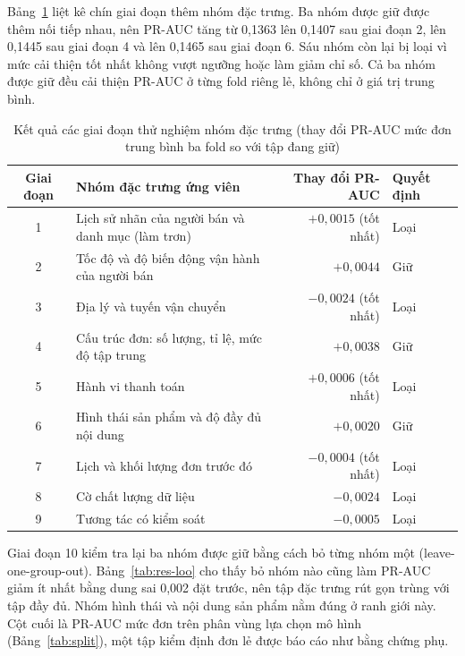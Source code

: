 \documentclass[12pt,a4paper]{report}
\begin{document}
Bảng~\ref{tab:res-phases} liệt kê chín giai đoạn thêm nhóm đặc trưng. Ba nhóm được giữ được thêm nối tiếp nhau, nên PR-AUC tăng từ 0,1363 lên 0,1407 sau giai đoạn 2, lên 0,1445 sau giai đoạn 4 và lên 0,1465 sau giai đoạn 6. Sáu nhóm còn lại bị loại vì mức cải thiện tốt nhất không vượt ngưỡng hoặc làm giảm chỉ số. Cả ba nhóm được giữ đều cải thiện PR-AUC ở từng fold riêng lẻ, không chỉ ở giá trị trung bình.

\begin{table}[htbp]\centering\small
\caption{Kết quả các giai đoạn thử nghiệm nhóm đặc trưng (thay đổi PR-AUC mức đơn trung bình ba fold so với tập đang giữ)}\label{tab:res-phases}
\begin{tabular}{clrl}
\toprule
Giai đoạn & Nhóm đặc trưng ứng viên & Thay đổi PR-AUC & Quyết định \\
\midrule
1 & Lịch sử nhãn của người bán và danh mục (làm trơn) & $+0{,}0015$ (tốt nhất) & Loại \\
2 & Tốc độ và độ biến động vận hành của người bán & $+0{,}0044$ & Giữ \\
3 & Địa lý và tuyến vận chuyển & $-0{,}0024$ (tốt nhất) & Loại \\
4 & Cấu trúc đơn: số lượng, tỉ lệ, mức độ tập trung & $+0{,}0038$ & Giữ \\
5 & Hành vi thanh toán & $+0{,}0006$ (tốt nhất) & Loại \\
6 & Hình thái sản phẩm và độ đầy đủ nội dung & $+0{,}0020$ & Giữ \\
7 & Lịch và khối lượng đơn trước đó & $-0{,}0004$ (tốt nhất) & Loại \\
8 & Cờ chất lượng dữ liệu & $-0{,}0024$ & Loại \\
9 & Tương tác có kiểm soát & $-0{,}0005$ & Loại \\
\bottomrule
\end{tabular}
\end{table}

Giai đoạn 10 kiểm tra lại ba nhóm được giữ bằng cách bỏ từng nhóm một (leave-one-group-out). Bảng~\ref{tab:res-loo} cho thấy bỏ nhóm nào cũng làm PR-AUC giảm ít nhất bằng dung sai 0,002 đặt trước, nên tập đặc trưng rút gọn trùng với tập đầy đủ. Nhóm hình thái và nội dung sản phẩm nằm đúng ở ranh giới này. Cột cuối là PR-AUC mức đơn trên phân vùng lựa chọn mô hình (Bảng~\ref{tab:split}), một tập kiểm định đơn lẻ được báo cáo như bằng chứng phụ.
\end{document}
